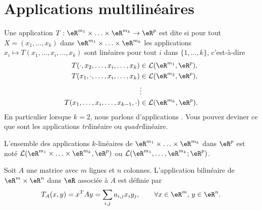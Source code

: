 
\section{Applications multilinéaires}

\begin{definition}       \label{DefFRHooKnPCT}
	Une application \( T: \eR^{m_1}\times \ldots \times\eR^{m_k}\to\eR^p \) est dite  si pour tout \( X=(x_1, \ldots,x_k)\) dans \(  \eR^{m_1}\times \ldots \times\eR^{m_k}\) les applications \( x_i\mapsto T(x_1, \ldots, x_i,\ldots,x_k)\) sont linéaires pour tout \( i\) dans \( \{1,\ldots,k\}\), c'est-à-dire
	\begin{equation}
		\begin{aligned}[]
			T(\cdot,x_2, \ldots, x_i,\ldots,x_k)     & \in \mathcal{L}(\eR^{m_1}, \eR^p), \\
			T(x_1,\cdot, \ldots, x_i,\ldots,x_k)     & \in \mathcal{L}(\eR^{m_2}, \eR^p), \\
			                                         & \vdots                             \\
			T(x_1, \ldots, x_i,\ldots,x_{k-1},\cdot) & \in \mathcal{L}(\eR^{m_k}, \eR^p). \\
		\end{aligned}
	\end{equation}
	En particulier lorsque \( k=2\), nous parlons d'applications . Vous pouvez deviner ce que sont les applications \emph{tri}linéaire ou \emph{quadri}linéaire.
\end{definition}

L'ensemble des applications \( k\)-linéaires de \(  \eR^{m_1}\times \ldots \times\eR^{m_k}\) dans \( \eR^p\) est noté \( \mathcal{L}(\eR^{m_1}\times \ldots \times\eR^{m_k}, \eR^p)\) ou \( \mathcal{L}(\eR^{m_1}, \ldots,\eR^{m_k}; \eR^p)\).

\begin{example}
	Soit \( A\) une matrice avec \( m\) lignes et \( n\) colonnes. L'application bilinéaire de \( \eR^m\times \eR^n\) dans \( \eR\) associée à \( A\) est définie par
	\[
		T_A(x,y)= x^TAy=\sum_{i,j}a_{i,j}x_i y_j, \qquad \forall x\in \eR^m, \, y \in \eR^n.
	\]
\end{example}

